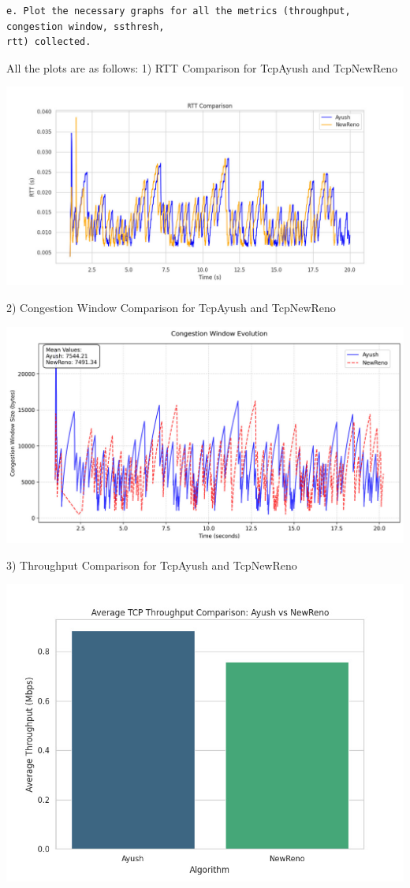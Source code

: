 \documentclass[11pt,a4paper]{article}
\begin{document}
\begin{verbatim}
e. Plot the necessary graphs for all the metrics (throughput, congestion window, ssthresh,
rtt) collected.
\end{verbatim}
All the plots are as follows:
1) RTT Comparison for TcpAyush and TcpNewReno
\begin{center}
    \includegraphics[width=1\columnwidth]{images/rtt-comp.jpg}
\end{center}
2) Congestion Window Comparison for TcpAyush and TcpNewReno
\begin{center}
    \includegraphics[width=1\columnwidth]{images/cwnd-comp.jpg}
\end{center}
3) Throughput Comparison for TcpAyush and TcpNewReno
\begin{center}
    \includegraphics[width=1\columnwidth]{images/t-comp.jpg}
\end{center}
\end{document}
